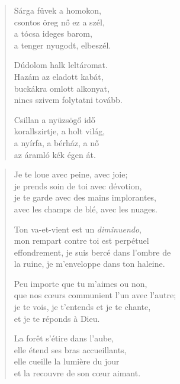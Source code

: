 \documentclass[11pt]{extbook}
\newcommand*{\centeredornament}{\centerline{\pgfornament[width=6cm]{88}}}
\begin{document}
\newpage

\vspace*{-15mm}
\centeredornament



\begin{verse}
  Sárga füvek a homokon, \\
  csontos öreg nő ez a szél, \\
  a tócsa ideges barom, \\
  a tenger nyugodt, elbeszél.

  Dúdolom halk leltáromat. \\
  Hazám az eladott kabát, \\
  buckákra omlott alkonyat, \\
  nincs szivem folytatni tovább.

  Csillan a nyüzsögő idő \\
  korallszirtje, a holt világ, \\
  a nyírfa, a bérház, a nő \\
  az áramló kék égen át.
\end{verse}

\newpage


\vspace*{-15mm}
\centeredornament



\begin{verse}
  Je te loue avec peine, avec joie; \\
  je prends soin de toi avec dévotion, \\
  je te garde avec des mains implorantes, \\
  avec les champs de blé, avec les nuages.

  Ton va-et-vient est un \emph{diminuendo}, \\
  mon rempart contre toi est perpétuel \\
  effondrement, je suis bercé dans l'ombre de \\
  la ruine, je m'enveloppe dans ton haleine.

  Peu importe que tu m'aimes ou non, \\
  que nos cœurs communient l'un avec l'autre;\hspace*{-1mm} \\
  je te vois, je t'entends et je te chante, \\
  et je te réponds à Dieu.

  La forêt s'étire dans l'aube, \\
  elle étend ses bras accueillants, \\
  elle cueille la lumière du jour \\
  et la recouvre de son cœur aimant.
\end{verse}
\end{document}
